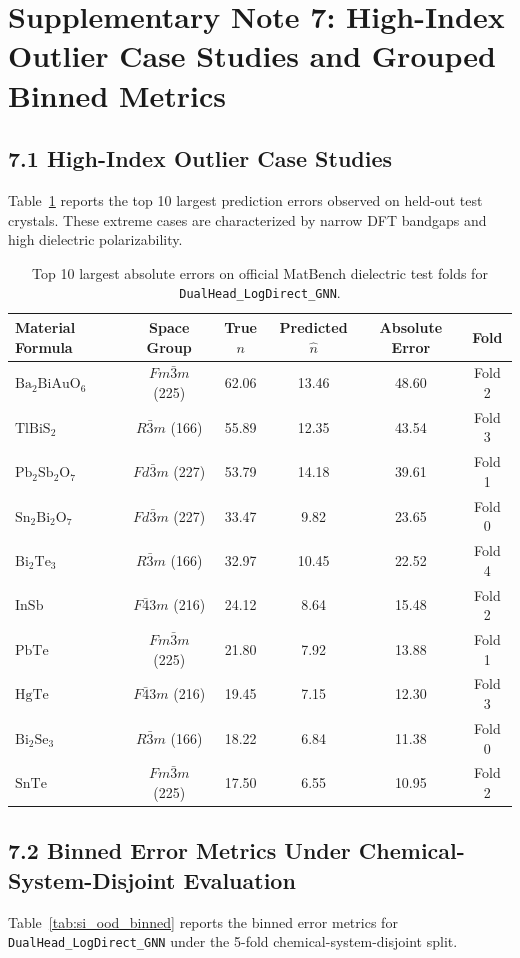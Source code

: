 \documentclass[journal,article,submit,moreauthors,pdftex]{article}
\begin{document}
\section*{Supplementary Note 7: High-Index Outlier Case Studies and Grouped Binned Metrics}

\subsection*{7.1 High-Index Outlier Case Studies}
Table~\ref{tab:si_outliers} reports the top 10 largest prediction errors observed on held-out test crystals. These extreme cases are characterized by narrow DFT bandgaps and high dielectric polarizability.

\begin{table}[htbp]
\centering
\caption{Top 10 largest absolute errors on official MatBench dielectric test folds for \texttt{DualHead\_LogDirect\_GNN}.}
\label{tab:si_outliers}
\begin{tabular}{lccccc}
\toprule
\textbf{Material Formula} & \textbf{Space Group} & \textbf{True $n$} & \textbf{Predicted $\hat{n}$} & \textbf{Absolute Error} & \textbf{Fold} \\
\midrule
$\mathrm{Ba_2BiAuO_6}$ & $Fm\bar{3}m$ (225) & 62.06 & 13.46 & 48.60 & Fold 2 \\
$\mathrm{TlBiS_2}$ & $R\bar{3}m$ (166) & 55.89 & 12.35 & 43.54 & Fold 3 \\
$\mathrm{Pb_2Sb_2O_7}$ & $Fd\bar{3}m$ (227) & 53.79 & 14.18 & 39.61 & Fold 1 \\
$\mathrm{Sn_2Bi_2O_7}$ & $Fd\bar{3}m$ (227) & 33.47 & 9.82 & 23.65 & Fold 0 \\
$\mathrm{Bi_2Te_3}$ & $R\bar{3}m$ (166) & 32.97 & 10.45 & 22.52 & Fold 4 \\
$\mathrm{InSb}$ & $F\bar{4}3m$ (216) & 24.12 & 8.64 & 15.48 & Fold 2 \\
$\mathrm{PbTe}$ & $Fm\bar{3}m$ (225) & 21.80 & 7.92 & 13.88 & Fold 1 \\
$\mathrm{HgTe}$ & $F\bar{4}3m$ (216) & 19.45 & 7.15 & 12.30 & Fold 3 \\
$\mathrm{Bi_2Se_3}$ & $R\bar{3}m$ (166) & 18.22 & 6.84 & 11.38 & Fold 0 \\
$\mathrm{SnTe}$ & $Fm\bar{3}m$ (225) & 17.50 & 6.55 & 10.95 & Fold 2 \\
\bottomrule
\end{tabular}
\end{table}

\subsection*{7.2 Binned Error Metrics Under Chemical-System-Disjoint Evaluation}
Table~\ref{tab:si_ood_binned} reports the binned error metrics for \texttt{DualHead\_LogDirect\_GNN} under the 5-fold chemical-system-disjoint split.
\end{document}
